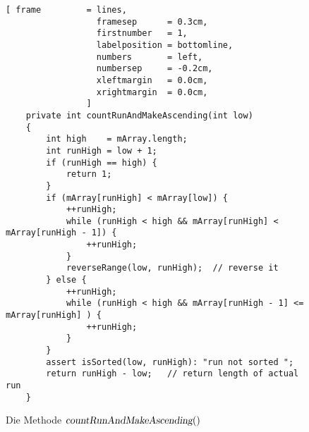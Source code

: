 \begin{figure}[!ht]
\centering
\begin{Verbatim}[ frame         = lines, 
                  framesep      = 0.3cm, 
                  firstnumber   = 1,
                  labelposition = bottomline,
                  numbers       = left,
                  numbersep     = -0.2cm,
                  xleftmargin   = 0.0cm,
                  xrightmargin  = 0.0cm,
                ]
    private int countRunAndMakeAscending(int low)
    {
        int high    = mArray.length;
        int runHigh = low + 1;
        if (runHigh == high) {
            return 1;
        }
        if (mArray[runHigh] < mArray[low]) {                                  
            ++runHigh;
            while (runHigh < high && mArray[runHigh] < mArray[runHigh - 1]) { 
                ++runHigh;
            }
            reverseRange(low, runHigh);  // reverse it
        } else {                                                                 
            ++runHigh;
            while (runHigh < high && mArray[runHigh - 1] <= mArray[runHigh] ) {  
                ++runHigh;
            }
        }
        assert isSorted(low, runHigh): "run not sorted ";
        return runHigh - low;   // return length of actual run
    }
\end{Verbatim}
\vspace*{-0.3cm}
\caption{Die Methode $\textsl{countRunAndMakeAscending}()$}
\label{fig:TimSort.java:countRunAndMakeAscending}
\end{figure}

